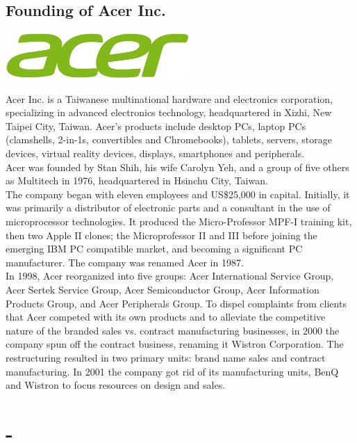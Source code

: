 \documentclass[11pt]{report}
\begin{document}
\subsection{Founding of Acer Inc.}
\vspace{2mm}\begin{center}\includegraphics[width=7cm]{./img/acerLogo.jpg}\end{center}
Acer Inc. is a Taiwanese multinational hardware and electronics corporation, specializing in advanced electronics technology, headquartered in Xizhi, New Taipei City, Taiwan. Acer's products include desktop PCs, laptop PCs (clamshells, 2-in-1s, convertibles and Chromebooks), tablets, servers, storage devices, virtual reality devices, displays, smartphones and peripherals.\\ \indent Acer was founded by Stan Shih, his wife Carolyn Yeh, and a group of five others as Multitech in 1976, headquartered in Hsinchu City, Taiwan.\\
\indent The company began with eleven employees and US\$25,000 in capital. Initially, it was primarily a distributor of electronic parts and a consultant in the use of microprocessor technologies. It produced the Micro-Professor MPF-I training kit, then two Apple II clones; the Microprofessor II and III before joining the emerging IBM PC compatible market, and becoming a significant PC manufacturer. The company was renamed Acer in 1987.\\
\indent In 1998, Acer reorganized into five groups: Acer International Service Group, Acer Sertek Service Group, Acer Semiconductor Group, Acer Information Products Group, and Acer Peripherals Group. To dispel complaints from clients that Acer competed with its own products and to alleviate the competitive nature of the branded sales vs. contract manufacturing businesses, in 2000 the company spun off the contract business, renaming it Wistron Corporation. The restructuring resulted in two primary units: brand name sales and contract manufacturing. In 2001 the company got rid of its manufacturing units, BenQ and Wistron to focus resources on design and sales.
\section{-}
\end{document}
